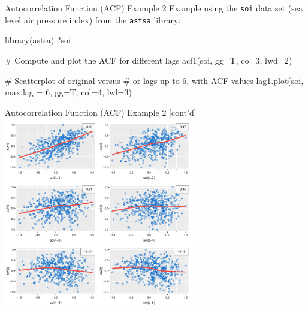 \documentclass[ignorenonframetext,xcolor=x11names]{beamer}
\begin{document}
\begin{frame}[fragile]{Autocorrelation Function (ACF) Example 2}
Example using the \texttt{soi} data set (sea level air pressure index) from the \texttt{astsa} library:
\begin{Rcode}
library(astsa)
?soi

# Compute and plot the ACF for different lags
acf1(soi, gg=T, co=3, lwd=2)

# Scatterplot of original versus
# or lags up to 6, with ACF values
lag1.plot(soi, max.lag = 6, 
    gg=T, col=4, lwl=3)
\end{Rcode}
\end{frame}

\begin{frame}{Autocorrelation Function (ACF) Example 2 \small [cont'd]}
\centering
\includegraphics[height=3.25in]{figure8a.pdf}
\end{frame}


\end{document}

